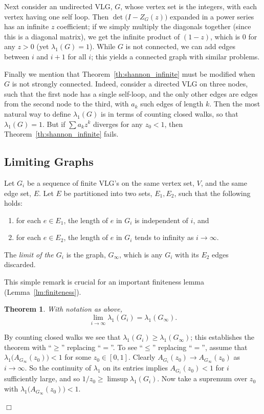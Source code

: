 \documentclass[12pt]{article}
\newtheorem{theorem}{Theorem}[section]
\newcommand{\proof}{{\par\noindent {\bf Proof}\space\space}}
\newcommand{\proofbox}{\begin{flushright}$\Box$\end{flushright}}
\begin{document}
Next consider an undirected VLG, $G$, whose vertex set is the integers,
with each vertex having one self loop.  Then $\det\bigl(I-Z_G(z)\bigr)$
expanded in a power series has an infinite $z$ coefficient; if we
simply multiply the diagonals together (since this is a diagonal matrix),
we get the infinite product of $(1-z)$, which is $0$ for any $z>0$
(yet $\lambda_1(G)=1$).
While $G$ is not connected, we can add edges between $i$ and $i+1$ for
all $i$; this yields a connected graph with similar problems.

Finally we mention that Theorem~\ref{th:shannon_infinite} must be
modified when $G$ is not strongly connected.  Indeed, consider a directed
VLG
on three nodes, such that the first node has a single self-loop, and
the only other edges are edges from the second node to the third,
with $a_k$ such edges of length $k$.  Then the most natural way to
define $\lambda_1(G)$ is in terms of counting closed walks, so that
$\lambda_1(G)=1$.  But if $\sum a_k z^k$ diverges for any $z_0<1$, then
Theorem~\ref{th:shannon_infinite} fails.


\subsection{Limiting Graphs}

Let $G_i$ be a sequence of finite VLG's on the same vertex set, $V$, and the
same edge set, $E$.  Let $E$ be partitioned into two sets, $E_1,E_2$,
such that the following holds:
\begin{enumerate}
\item for each $e\in E_1$, the length of $e$ in $G_i$ is independent of $i$,
and
\item for each $e\in E_2$, the length of $e$ in $G_i$ tends to infinity
as $i\to\infty$.
\end{enumerate}
The {\em limit of the $G_i$} is the graph, $G_\infty$, which is any
$G_i$ with its $E_2$ edges discarded.

This simple remark is crucial for an important finiteness lemma
(Lemma~\ref{lm:finiteness}).
\begin{theorem}\label{th:infinite_edge}
With notation as above, 
$$
\lim_{i\to\infty} \lambda_1(G_i) = \lambda_1(G_\infty).
$$
\end{theorem}
\proof By counting closed walks we see that
$\lambda_1(G_i)\ge\lambda_1(G_\infty)$; this establishes the theorem
with ``$\ge$'' replacing ``$=$''.  To see ``$\le$'' replacing ``$=$'', 
assume that
$\lambda_1\bigl(A_{G_\infty}(z_0)\bigr)<1$ for some $z_0\in [0,1]$.  Clearly
$A_{G_i}(z_0)\to A_{G_\infty}(z_0)$ as $i\to\infty$.  So the continuity
of $\lambda_1$ on its entries implies $A_{G_i}(z_0)<1$ for $i$ sufficiently
large, and so $1/z_0\ge \limsup\lambda_1(G_i)$.  Now take a supremum over
$z_0$ with $\lambda_1\bigl(A_{G_\infty}(z_0)\bigr)<1$.
\proofbox
\end{document}
